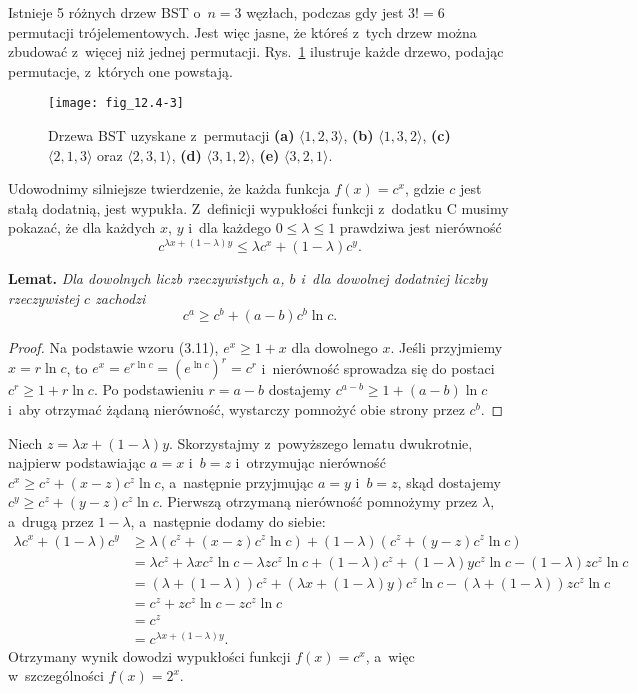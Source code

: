 \exercise %
Istnieje 5 różnych drzew BST o~$n=3$ węzłach, podczas gdy jest $3!=6$ permutacji trójelementowych.
Jest więc jasne, że któreś z~tych drzew można zbudować z~więcej niż jednej permutacji.
Rys.~\ref{fig:12.4-3} ilustruje każde drzewo, podając permutacje, z~których one powstają.
\begin{figure}[ht]
	\begin{center}
		\texttt{[image: fig\_12.4-3]}
	\end{center}
	\caption{Drzewa BST uzyskane z~permutacji {\sffamily\bfseries(a)} $\langle1,2,3\rangle$,
{\sffamily\bfseries(b)} $\langle1,3,2\rangle$,
{\sffamily\bfseries(c)} $\langle2,1,3\rangle$ oraz $\langle2,3,1\rangle$, {\sffamily\bfseries(d)} $\langle3,1,2\rangle$, {\sffamily\bfseries(e)} $\langle3,2,1\rangle$.} \label{fig:12.4-3}
\end{figure}

\exercise %
Udowodnimy silniejsze twierdzenie, że każda funkcja $f(x)=c^x$, gdzie $c$ jest stałą dodatnią, jest wypukła.
Z~definicji wypukłości funkcji z~dodatku C musimy pokazać, że dla każdych $x$, $y$ i~dla każdego $0\le\lambda\le1$ prawdziwa jest nierówność
\[
	c^{\lambda x+(1-\lambda)y} \le \lambda c^x+(1-\lambda)c^y.
\]

\medskip
\noindent\textsf{\textbf{Lemat.}} \textit{Dla dowolnych liczb rzeczywistych\/ $a$,\/ $b$ i~dla dowolnej dodatniej liczby rzeczywistej\/ $c$ zachodzi
\[
	c^a \ge c^b+(a-b)c^b\ln c.
\]}
\begin{proof}
Na podstawie wzoru (3.11), $e^x\ge1+x$ dla dowolnego $x$.
Jeśli przyjmiemy $x=r\ln c$, to $e^x=e^{r\ln c}=(e^{\ln c})^r=c^r$ i~nierówność sprowadza się do postaci $c^r\ge1+r\ln c$.
Po podstawieniu $r=a-b$ dostajemy $c^{a-b}\ge1+(a-b)\ln c$ i~aby otrzymać żądaną nierówność, wystarczy pomnożyć obie strony przez $c^b$.
\end{proof}

Niech $z=\lambda x+(1-\lambda)y$.
Skorzystajmy z~powyższego lematu dwukrotnie, najpierw podstawiając $a=x$ i~$b=z$ i~otrzymując nierówność $c^x\ge c^z+(x-z)c^z\ln c$, a~następnie przyjmując $a=y$ i~$b=z$, skąd dostajemy $c^y\ge c^z+(y-z)c^z\ln c$.
Pierwszą otrzymaną nierówność pomnożymy przez $\lambda$, a~drugą przez $1-\lambda$, a~następnie dodamy do siebie:
\begin{align*}
	\lambda c^x+(1-\lambda)c^y &\ge \lambda(c^z+(x-z)c^z\ln c)+(1-\lambda)(c^z+(y-z)c^z\ln c) \\
	&= \lambda c^z+\lambda xc^z\ln c-\lambda zc^z\ln c+(1-\lambda)c^z+(1-\lambda)yc^z\ln c-(1-\lambda)zc^z\ln c \\
	&= (\lambda+(1-\lambda))c^z+(\lambda x+(1-\lambda)y)c^z\ln c-(\lambda+(1-\lambda))zc^z\ln c \\
	&= c^z+zc^z\ln c-zc^z\ln c \\
	&= c^z \\
	&= c^{\lambda x+(1-\lambda)y}.
\end{align*}
Otrzymany wynik dowodzi wypukłości funkcji $f(x)=c^x$, a~więc w~szczególności $f(x)=2^x$.

